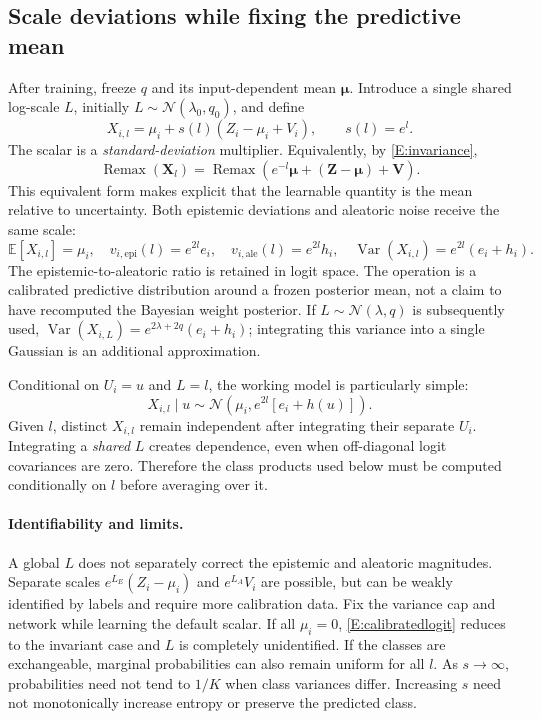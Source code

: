 \documentclass[letterpaper]{article}
\newcommand{\E}{\mathbb E}
\newcommand{\Var}{\operatorname{Var}}
\newcommand{\Normal}{\mathcal N}
\newcommand{\Remax}{\operatorname{Remax}}
\newcommand{\given}{\mid}
\begin{document}
\subsection{Scale deviations while fixing the predictive mean}
After training, freeze $q$ and its input-dependent mean $\bm\mu$. Introduce a single shared log-scale $L$, initially $L\sim\Normal(\lambda_0,q_0)$, and define
\begin{equation}
\boxed{
X_{i,l}=\mu_i+s(l)(Z_i-\mu_i+V_i),\qquad s(l)=e^l.
}\label{E:calibratedlogit}
\end{equation}
The scalar is a \emph{standard-deviation} multiplier. Equivalently, by \eqref{E:invariance},
\begin{equation}
\Remax(\bm X_l)=\Remax\!\left(e^{-l}\bm\mu+(\bm Z-\bm\mu)+\bm V\right).
\label{E:equivmean}
\end{equation}
This equivalent form makes explicit that the learnable quantity is the mean relative to uncertainty. Both epistemic deviations and aleatoric noise receive the same scale:
\begin{equation}
\E[X_{i,l}]=\mu_i,\quad
v_{i,\mathrm{epi}}(l)=e^{2l}e_i,\quad
v_{i,\mathrm{ale}}(l)=e^{2l}h_i,\quad
\Var(X_{i,l})=e^{2l}(e_i+h_i).
\label{E:totalvariance}
\end{equation}
The epistemic-to-aleatoric ratio is retained in logit space. The operation is a calibrated predictive distribution around a frozen posterior mean, not a claim to have recomputed the Bayesian weight posterior. If $L\sim\Normal(\lambda,q)$ is subsequently used, $\Var(X_{i,L})=e^{2\lambda+2q}(e_i+h_i)$; integrating this variance into a single Gaussian is an additional approximation.

Conditional on $U_i=u$ and $L=l$, the working model is particularly simple:
\begin{equation}
X_{i,l}\given u\sim\Normal\!\left(\mu_i,e^{2l}[e_i+h(u)]\right).
\label{E:conditionalx}
\end{equation}
Given $l$, distinct $X_{i,l}$ remain independent after integrating their separate $U_i$. Integrating a \emph{shared} $L$ creates dependence, even when off-diagonal logit covariances are zero. Therefore the class products used below must be computed conditionally on $l$ before averaging over it.

\paragraph{Identifiability and limits.}
A global $L$ does not separately correct the epistemic and aleatoric magnitudes. Separate scales $e^{L_E}(Z_i-\mu_i)$ and $e^{L_A}V_i$ are possible, but can be weakly identified by labels and require more calibration data. Fix the variance cap and network while learning the default scalar. If all $\mu_i=0$, \eqref{E:calibratedlogit} reduces to the invariant case and $L$ is completely unidentified. If the classes are exchangeable, marginal probabilities can also remain uniform for all $l$. As $s\to\infty$, probabilities need not tend to $1/K$ when class variances differ. Increasing $s$ need not monotonically increase entropy or preserve the predicted class.
\end{document}
